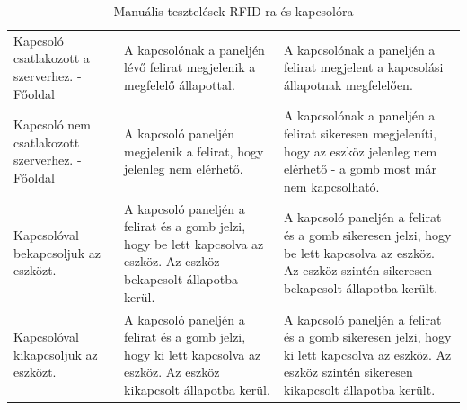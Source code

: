 \documentclass[
]{thesis-ekf}
\theoremstyle{definition}
\theoremstyle{remark}
\begin{document}
\begin{table}
\begin{tabular}{|p{}|p{}|p{}|}
				Kapcsoló csatlakozott a szerverhez. - Főoldal &
				
				A kapcsolónak a paneljén lévő felirat megjelenik a megfelelő állapottal. &
				
				A kapcsolónak a paneljén a felirat megjelent a kapcsolási állapotnak megfelelően. \\
				\rowcolor[HTML]{FFFFFF} 
				
				Kapcsoló nem csatlakozott szerverhez. - Főoldal &
				
				A kapcsoló paneljén megjelenik a felirat, hogy jelenleg nem elérhető. &
				
				A kapcsolónak a paneljén a felirat sikeresen megjeleníti, hogy az eszköz jelenleg nem elérhető - a gomb most már nem kapcsolható. \\
				\rowcolor[HTML]{EFEFEF} 
				Kapcsolóval bekapcsoljuk az eszközt. &
				
				A kapcsoló paneljén a felirat és a gomb jelzi, hogy be lett kapcsolva az eszköz. Az eszköz bekapcsolt állapotba kerül. &
				
				A kapcsoló paneljén a felirat és a gomb sikeresen jelzi, hogy be lett kapcsolva az eszköz. Az eszköz szintén sikeresen bekapcsolt állapotba került. \\
				\rowcolor[HTML]{FFFFFF} 
				
				Kapcsolóval kikapcsoljuk az eszközt. &
				
				A kapcsoló paneljén a felirat és a gomb jelzi, hogy ki lett kapcsolva az eszköz. Az eszköz kikapcsolt állapotba kerül. &
				
				A kapcsoló paneljén a felirat és a gomb sikeresen jelzi, hogy ki lett  kapcsolva az eszköz. Az eszköz szintén sikeresen kikapcsolt állapotba került. \\ \hline
		\end{tabular}
		\caption{Manuális tesztelések RFID-ra és kapcsolóra}
		\label{rfid-toggle-test-table}
\end{table}
\end{document}
